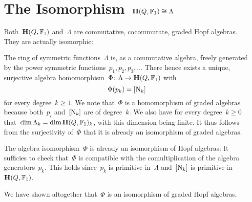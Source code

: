 \documentclass[a4paper, 11pt, twoside=semi]{scrartcl}
\begin{document}
\section{The Isomorphism~$\mathbf{H}(Q, \mathbb{F}_1) \cong \Lambda$}
\label{the isomorphism}


Both~$\mathbf{H}(Q, \mathbb{F}_1)$ and~$\Lambda$ are commutative, cocommutate, graded Hopf algebras.
They are actually isomorphic:

The ring of symmetric functions~$\Lambda$ is, as a commutative algebra, freely generated by the power symmetric functions~$p_1, p_2, p_3, \dotsc$
There hence exists a unique, surjective algebra homomorphism~$\Phi \colon \Lambda \to \mathbf{H}(Q, \mathbb{F}_1)$ with
\[
  \Phi(p_k) = [\mathrm{N}_k]
\]
for every degree~$k \geq 1$.
We note that~$\Phi$ is a homomorphism of graded algebras because both~$p_i$ and~$[ \mathrm{N}_k ]$ are of degree~$k$.
We also have for every degree~$k \geq 0$ that~$\dim \Lambda_k = \dim \mathbf{H}(Q, \mathbb{F}_1)_k$, with this dimension being finite.
It thus follows from the surjectivity of~$\Phi$ that it is already an isomorphism of graded algebras.

The algebra isomorphism~$\Phi$ is already an isomorphism of Hopf algebras:
It sufficies to check that~$\Phi$ is compatible with the comultiplication of the algebra generators~$p_k$.
This holds since~$p_k$ is primitive in~$\Lambda$ and~$[ \mathrm{N}_k ]$ is primitive in~$\mathbf{H}(Q, \mathbb{F}_1)$.

We have shown altogether that~$\Phi$ is an isomorphism of graded Hopf algebras.
\end{document}
